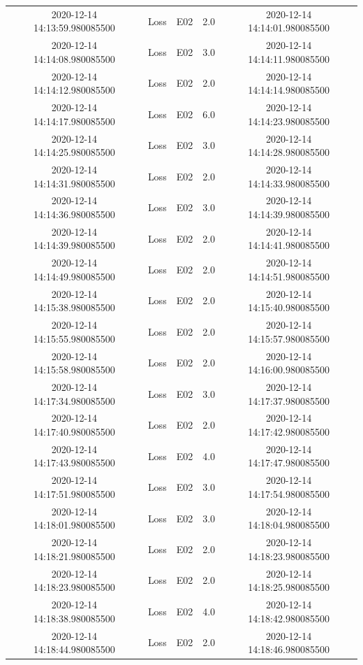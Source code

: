 \begin{enumerate}
\begin{longtabu}{ccccc}
2020{-}12{-}14 14:13:59.980085500&Loss&E02&2.0&2020{-}12{-}14 14:14:01.980085500\\%
2020{-}12{-}14 14:14:08.980085500&Loss&E02&3.0&2020{-}12{-}14 14:14:11.980085500\\%
2020{-}12{-}14 14:14:12.980085500&Loss&E02&2.0&2020{-}12{-}14 14:14:14.980085500\\%
2020{-}12{-}14 14:14:17.980085500&Loss&E02&6.0&2020{-}12{-}14 14:14:23.980085500\\%
2020{-}12{-}14 14:14:25.980085500&Loss&E02&3.0&2020{-}12{-}14 14:14:28.980085500\\%
2020{-}12{-}14 14:14:31.980085500&Loss&E02&2.0&2020{-}12{-}14 14:14:33.980085500\\%
2020{-}12{-}14 14:14:36.980085500&Loss&E02&3.0&2020{-}12{-}14 14:14:39.980085500\\%
2020{-}12{-}14 14:14:39.980085500&Loss&E02&2.0&2020{-}12{-}14 14:14:41.980085500\\%
2020{-}12{-}14 14:14:49.980085500&Loss&E02&2.0&2020{-}12{-}14 14:14:51.980085500\\%
2020{-}12{-}14 14:15:38.980085500&Loss&E02&2.0&2020{-}12{-}14 14:15:40.980085500\\%
2020{-}12{-}14 14:15:55.980085500&Loss&E02&2.0&2020{-}12{-}14 14:15:57.980085500\\%
2020{-}12{-}14 14:15:58.980085500&Loss&E02&2.0&2020{-}12{-}14 14:16:00.980085500\\%
2020{-}12{-}14 14:17:34.980085500&Loss&E02&3.0&2020{-}12{-}14 14:17:37.980085500\\%
2020{-}12{-}14 14:17:40.980085500&Loss&E02&2.0&2020{-}12{-}14 14:17:42.980085500\\%
2020{-}12{-}14 14:17:43.980085500&Loss&E02&4.0&2020{-}12{-}14 14:17:47.980085500\\%
2020{-}12{-}14 14:17:51.980085500&Loss&E02&3.0&2020{-}12{-}14 14:17:54.980085500\\%
2020{-}12{-}14 14:18:01.980085500&Loss&E02&3.0&2020{-}12{-}14 14:18:04.980085500\\%
2020{-}12{-}14 14:18:21.980085500&Loss&E02&2.0&2020{-}12{-}14 14:18:23.980085500\\%
2020{-}12{-}14 14:18:23.980085500&Loss&E02&2.0&2020{-}12{-}14 14:18:25.980085500\\%
2020{-}12{-}14 14:18:38.980085500&Loss&E02&4.0&2020{-}12{-}14 14:18:42.980085500\\%
2020{-}12{-}14 14:18:44.980085500&Loss&E02&2.0&2020{-}12{-}14 14:18:46.980085500\\%

\end{longtabu}
\end{enumerate}
